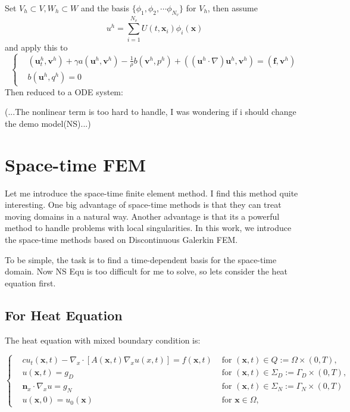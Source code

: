 Set $V_h\subset V, W_h\subset W$ and the basis $\{\phi_1, \phi_2,\cdots \phi_{N_v}\}$ for $V_h$, then assume $$u^h=\sum_{i=1}^{N_v}U(t,\textbf{x}_i)\phi_i(\textbf{x})$$ and apply this to 
\begin{equation*}\left\{
    \begin{aligned}
        &(\textbf{u}^h_t, \textbf{v}^h)+\gamma a(\textbf{u}^h, \textbf{v}^h)-\frac{1}{\rho}b(\textbf{v}^h, p^h)+((\textbf{u}^h\cdot \nabla)\textbf{u}^h, \textbf{v}^h)=(\textbf{f}, \textbf{v}^h)\\
        &b(\textbf{u}^h, q^h)=0
    \end{aligned}\right.
\end{equation*}
Then reduced to a ODE system:

($...$The nonlinear term is too hard to handle, I was wondering if i should change the demo model(NS)...)

\section{Space-time FEM}
Let me introduce the space-time finite element method.
I find this method quite interesting. One big advantage of space-time methods is that they can treat moving domains in a natural way. Another advantage is that its a powerful method to 
handle problems with local singularities. In this work, we introduce the space-time methods based on Discontinuous Galerkin FEM.

To be simple, the task is to find a time-dependent basis for the space-time domain. Now NS Equ is too difficult for me to solve, so lets consider the heat equation first.
\subsection{For Heat Equation}
The heat equation with mixed boundary condition is:

$$\left\{\begin{aligned}
&c  u_t(\textbf{x}, t)-\nabla_x \cdot\left[A(\textbf{x}, t) \nabla_x u(x, t)\right]  =f(\textbf{x}, t) & \text { for }(\textbf{x}, t) \in Q:=\Omega \times(0, T), \\
&u(\textbf{x}, t) =g_D  & \text { for }(\textbf{x}, t) \in \Sigma_D:=\Gamma_D \times(0, T), \\
&\textbf{n}_x\cdot \nabla_xu=g_N & \text{ for } (\textbf{x}, t) \in \Sigma_N:=\Gamma_N \times(0, T)\\
&u(\textbf{x}, 0) =u_{0}(\textbf{x})  & \text { for } \textbf{x} \in \Omega,
\end{aligned}\right.$$

